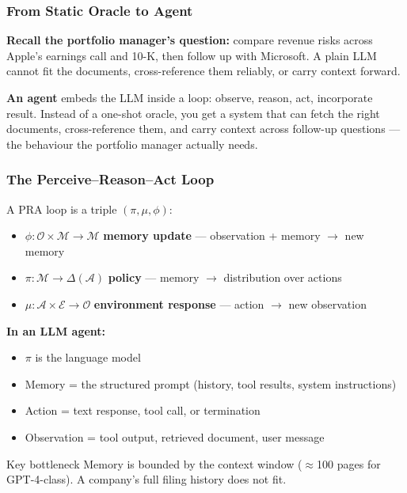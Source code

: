 \documentclass[9pt,t]{beamer}
\begin{document}
\begin{frame}
\frametitle{From Static Oracle to Agent}

\textbf{Recall the portfolio manager's question:} compare revenue risks across
Apple's earnings call and 10-K, then follow up with Microsoft. A plain LLM cannot
fit the documents, cross-reference them reliably, or carry context forward.

\medskip
\begin{bigpicture}
\textbf{An agent} embeds the LLM inside a loop: observe, reason, act, incorporate
result. Instead of a one-shot oracle, you get a system that can fetch the right
documents, cross-reference them, and carry context across follow-up questions ---
the behaviour the portfolio manager actually needs.
\end{bigpicture}
\end{frame}

\begin{frame}
\frametitle{The Perceive--Reason--Act Loop}

\begin{underhood}
A PRA loop is a triple $(\pi, \mu, \phi)$:
\begin{itemize}
  \item $\phi: \mathcal{O} \times \mathcal{M} \to \mathcal{M}$ \quad
        \textbf{memory update} — observation + memory $\to$ new memory
  \item $\pi: \mathcal{M} \to \Delta(\mathcal{A})$ \quad
        \textbf{policy} — memory $\to$ distribution over actions
  \item $\mu: \mathcal{A} \times \mathcal{E} \to \mathcal{O}$ \quad
        \textbf{environment response} — action $\to$ new observation
\end{itemize}
\end{underhood}

\smallskip
\textbf{In an LLM agent:}
\begin{itemize}
  \item $\pi$ is the language model
  \item Memory = the structured prompt (history, tool results, system instructions)
  \item Action = text response, tool call, or termination
  \item Observation = tool output, retrieved document, user message
\end{itemize}

\smallskip
\begin{alertblock}{Key bottleneck}
Memory is bounded by the context window ($\approx$100 pages for GPT-4-class).
A company's full filing history does not fit.
\end{alertblock}
\end{frame}
\end{document}
